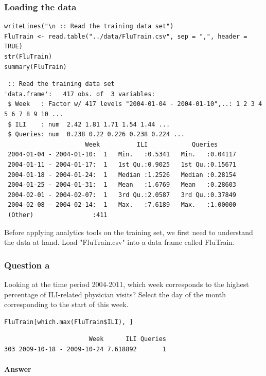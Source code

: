 \documentclass[letterpaper, 9pt, onecolumn, twoside, technote, final]{IEEEtran}
\begin{document}
\subsubsection{Loading the data}
\label{sec-3-1-2}

\begin{verbatim}
writeLines("\n :: Read the training data set")
FluTrain <- read.table("../data/FluTrain.csv", sep = ",", header = TRUE)
str(FluTrain)
summary(FluTrain)
\end{verbatim}

\begin{verbatim}
 :: Read the training data set
'data.frame':	417 obs. of  3 variables:
 $ Week   : Factor w/ 417 levels "2004-01-04 - 2004-01-10",..: 1 2 3 4 5 6 7 8 9 10 ...
 $ ILI    : num  2.42 1.81 1.71 1.54 1.44 ...
 $ Queries: num  0.238 0.22 0.226 0.238 0.224 ...
                      Week          ILI            Queries
 2004-01-04 - 2004-01-10:  1   Min.   :0.5341   Min.   :0.04117
 2004-01-11 - 2004-01-17:  1   1st Qu.:0.9025   1st Qu.:0.15671
 2004-01-18 - 2004-01-24:  1   Median :1.2526   Median :0.28154
 2004-01-25 - 2004-01-31:  1   Mean   :1.6769   Mean   :0.28603
 2004-02-01 - 2004-02-07:  1   3rd Qu.:2.0587   3rd Qu.:0.37849
 2004-02-08 - 2004-02-14:  1   Max.   :7.6189   Max.   :1.00000
 (Other)                :411
\end{verbatim}

Before applying analytics tools on the training set, we first need to
understand the data at hand. Load "FluTrain.csv" into a data frame
called FluTrain.

\subsubsection{Question a}
\label{sec-3-1-3}

Looking at the time period 2004-2011, which week corresponds to the
highest percentage of ILI-related physician visits? Select the day of
the month corresponding to the start of this week.

\begin{verbatim}
FluTrain[which.max(FluTrain$ILI), ]
\end{verbatim}

\begin{verbatim}
                       Week      ILI Queries
303 2009-10-18 - 2009-10-24 7.618892       1
\end{verbatim}

\paragraph{Answer}
\label{sec-3-1-3-1}
\end{document}
